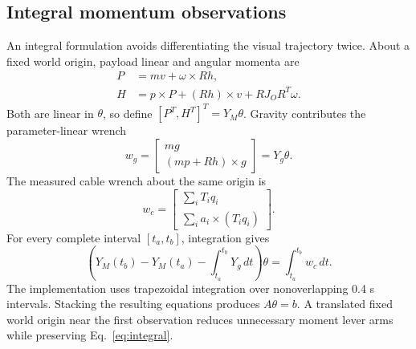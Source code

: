 \subsection{Integral momentum observations}
An integral formulation avoids differentiating the visual trajectory twice. About a fixed world origin, payload linear and angular momenta are
\begin{align}
 P&=mv+\omega\times Rh,\\
 H&=p\times P+(Rh)\times v+RJ_OR^T\omega.
 \label{eq:momentum}
\end{align}
Both are linear in $\theta$, so define $[P^T,H^T]^T=Y_M\theta$. Gravity contributes the parameter-linear wrench
\begin{equation}
 w_g=\begin{bmatrix}mg\\(mp+Rh)\times g\end{bmatrix}=Y_g\theta.
\end{equation}
The measured cable wrench about the same origin is
\begin{equation}
 w_c=\begin{bmatrix}\sum_i T_iq_i\\\sum_i a_i\times(T_iq_i)\end{bmatrix}.
\end{equation}
For every complete interval $[t_a,t_b]$, integration gives
\begin{equation}
 \left(Y_M(t_b)-Y_M(t_a)-\int_{t_a}^{t_b}Y_g\,dt\right)\theta
       =\int_{t_a}^{t_b}w_c\,dt.
 \label{eq:integral}
\end{equation}
The implementation uses trapezoidal integration over nonoverlapping 0.4 s intervals. Stacking the resulting equations produces $A\theta=b$. A translated fixed world origin near the first observation reduces unnecessary moment lever arms while preserving Eq.~\eqref{eq:integral}.

